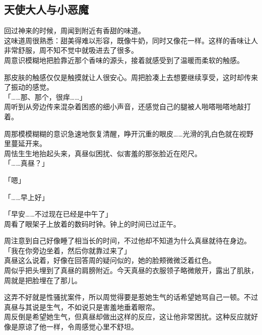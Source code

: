 \subsection{天使大人与小恶魔}

回过神来的时候，周闻到附近有香甜的味道。\\

这味道周很熟悉：甜美得难以形容，既像牛奶，同时又像花一样。这样的香味让人非常舒服，周不知不觉中就吸进去了很多。\\

周意识模糊地把脸靠近那个香味的源头，接着就感受到了温暖而柔软的触感。

那皮肤的触感仅仅是触摸就让人很安心。周把脸凑上去想要继续享受，这时却传来了振动的感觉。\\

「……那、那个，很痒……」\\

周听到从旁边传来混杂着困惑的细小声音，还感觉自己的腿被人啪嗒啪嗒地敲打着。

周那模模糊糊的意识急速地恢复清醒，睁开沉重的眼皮……光滑的乳白色就在视野里蔓延开来。\\

周怯生生地抬起头来，真昼似困扰、似害羞的那张脸近在咫尺。\\

「……真昼？」

「嗯」

「……早上好」

「早安……不过现在已经是中午了」\\

周看了眼架子上放着的数码时钟。钟上的时间已过正午。

周注意到自己好像睡了相当长的时间，不过他却不知道为什么真昼就待在身边。\\

「我在你旁边坐着，然后你就靠过来了」\\

真昼这么说着，好像在回答周的疑问似的，她的脸颊微微泛着红色。\\

周似乎把头埋到了真昼的肩膀附近。今天真昼的衣服领子略微敞开，露出了肌肤，周就是把脸埋在了那儿。

这弄不好就是性骚扰案件，所以周觉得要是惹她生气的话希望她骂自己一顿。不过真昼与其说是生气，不如说只是害羞地垂着眼帘。\\

周反倒是希望她生气，但真昼却做出这样的反应，这让他非常困扰。这种反应就好像是原谅了他一样，令周感觉心里不舒坦。\\

